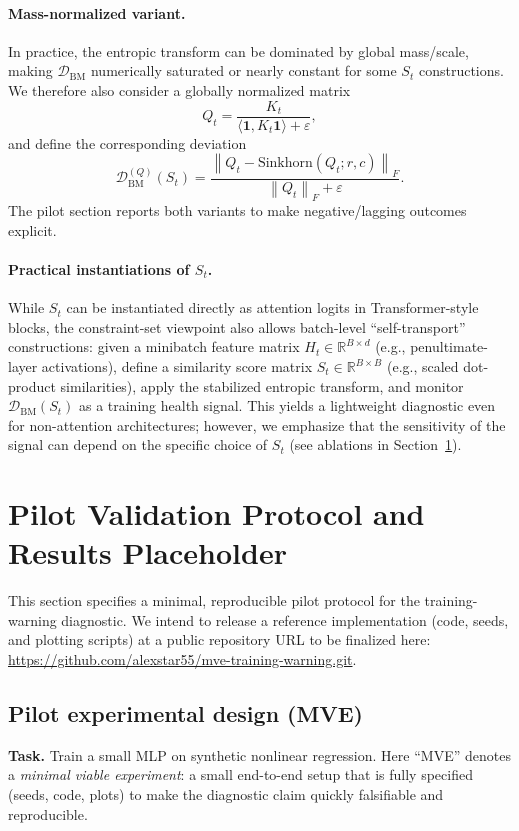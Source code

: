 \documentclass[11pt]{article}
\newcommand{\R}{\mathbb{R}}
\newcommand{\norm}[1]{\left\lVert #1 \right\rVert}
\newcommand{\eps}{\varepsilon}
\begin{document}
\paragraph{Mass-normalized variant.}
In practice, the entropic transform can be dominated by global mass/scale, making $\mathcal{D}_{\text{BM}}$ numerically saturated or nearly constant for some $S_t$ constructions.
We therefore also consider a globally normalized matrix
\[
Q_t=\frac{K_t}{\langle \mathbf{1},K_t\mathbf{1}\rangle+\eps},
\]
and define the corresponding deviation
\begin{equation}
\mathcal{D}_{\text{BM}}^{(Q)}(S_t)
=
\frac{\norm{Q_t-\text{Sinkhorn}(Q_t;r,c)}_F}{\norm{Q_t}_F+\eps}.
\end{equation}
The pilot section reports both variants to make negative/lagging outcomes explicit.
\paragraph{Practical instantiations of $S_t$.}
While $S_t$ can be instantiated directly as attention logits in Transformer-style blocks, the constraint-set viewpoint also allows batch-level ``self-transport'' constructions: given a minibatch feature matrix $H_t\in\R^{B\times d}$ (e.g., penultimate-layer activations), define a similarity score matrix $S_t\in\R^{B\times B}$ (e.g., scaled dot-product similarities), apply the stabilized entropic transform, and monitor $\mathcal{D}_{\text{BM}}(S_t)$ as a training health signal. This yields a lightweight diagnostic even for non-attention architectures; however, we emphasize that the sensitivity of the signal can depend on the specific choice of $S_t$ (see ablations in Section~\ref{sec:pilot}).

\section{Pilot Validation Protocol and Results Placeholder}
\label{sec:pilot}

This section specifies a minimal, reproducible pilot protocol for the training-warning diagnostic. We intend to release a reference implementation (code, seeds, and plotting scripts) at a public repository URL to be finalized here: \url{https://github.com/alexstar55/mve-training-warning.git}.

\subsection{Pilot experimental design (MVE)}
\textbf{Task.}
Train a small MLP on synthetic nonlinear regression. Here ``MVE'' denotes a \emph{minimal viable experiment}: a small end-to-end setup that is fully specified (seeds, code, plots) to make the diagnostic claim quickly falsifiable and reproducible.
\end{document}
